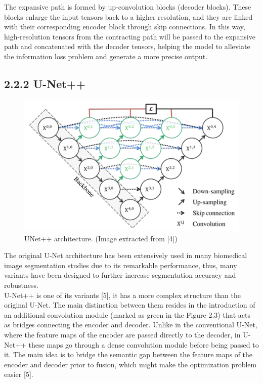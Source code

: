 The expansive path is formed by up-convolution blocks (decoder blocks). These blocks enlarge the input tensors back to a higher resolution, and they are linked with their corresponding encoder block through skip connections. In this way, high-resolution tensors from the contracting path will be passed to the expansive path and concatenated with the decoder tensors, helping the model to alleviate the information loss problem and generate a more precise output. \\

\subsection{2.2.2 U-Net++}
\begin{figure}[H]
 \centering
 \includegraphics[scale=0.9]{IMAGENES/IMG4-UNetPP.PNG}
 \captionsetup{font=large}
 \caption {UNet++ architecture. (Image extracted from [4]) }
\end{figure}

The original U-Net architecture has been extensively used in many biomedical image segmentation studies due to its remarkable performance, thus, many variants have been designed to further increase segmentation accuracy and robustness.\\


U-Net++ is one of its variants [5], it has a more complex structure than the original U-Net. The main distinction between them resides in the introduction of an additional convolution module (marked as green in the Figure 2.3) that acts as bridges connecting the encoder and decoder. Unlike in the conventional U-Net, where the feature maps of the encoder are passed directly to the decoder, in U-Net++ these maps go through a dense convolution module before being passed to it. The main idea is to bridge the semantic gap between the feature maps of the encoder and decoder prior to fusion, which might make the optimization problem easier [5].\\

